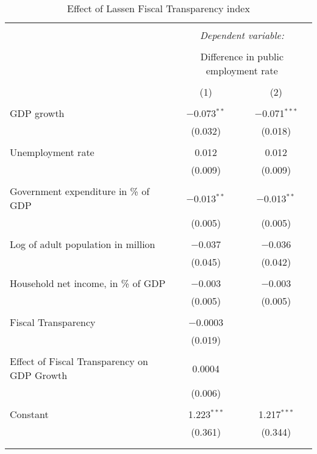 
\begin{table}[!htbp] \centering 
  \caption{Effect of Lassen Fiscal Transparency index} 
  \label{} 
\begin{tabular}{@{\extracolsep{5pt}}lcc} 
\\[-1.8ex]\hline 
\hline \\[-1.8ex] 
 & \multicolumn{2}{c}{\textit{Dependent variable:}} \\ 
\cline{2-3} 
\\[-1.8ex] & \multicolumn{2}{c}{Difference in public employment rate} \\ 
\\[-1.8ex] & (1) & (2)\\ 
\hline \\[-1.8ex] 
 GDP growth & $-$0.073$^{**}$ & $-$0.071$^{***}$ \\ 
  & (0.032) & (0.018) \\ 
  & & \\ 
 Unemployment rate & 0.012 & 0.012 \\ 
  & (0.009) & (0.009) \\ 
  & & \\ 
 Government expenditure in \% of GDP & $-$0.013$^{**}$ & $-$0.013$^{**}$ \\ 
  & (0.005) & (0.005) \\ 
  & & \\ 
 Log of adult population in million & $-$0.037 & $-$0.036 \\ 
  & (0.045) & (0.042) \\ 
  & & \\ 
 Household net income, in \% of GDP & $-$0.003 & $-$0.003 \\ 
  & (0.005) & (0.005) \\ 
  & & \\ 
 Fiscal Transparency & $-$0.0003 &  \\ 
  & (0.019) &  \\ 
  & & \\ 
 Effect of Fiscal Transparency on GDP Growth & 0.0004 &  \\ 
  & (0.006) &  \\ 
  & & \\ 
 Constant & 1.223$^{***}$ & 1.217$^{***}$ \\ 
  & (0.361) & (0.344) \\ 
  & & \\ 
\hline \\[-1.8ex] 

\end{tabular}
\end{table}
